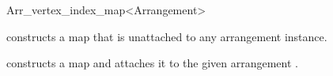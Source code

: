 \begin{ccRefClass}{Arr_vertex_index_map<Arrangement>}
\ccCreation
{}

    {constructs a map that is unattached to any arrangement instance.}
 
    {constructs a map and attaches it to the given arrangement .}

\ccSeeAlso
\\
  
\end{ccRefClass}

\ccRefPageEnd
